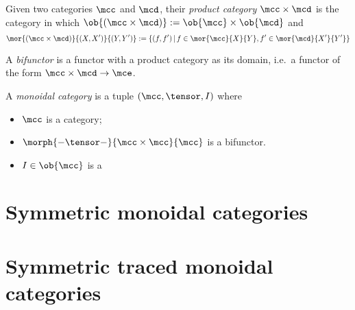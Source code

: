 \begin{definition}
    Given two categories \(\mcc\) and \(\mcd\), their \emph{product category}
    \(\mcc \times \mcd\) is the category in which \(
        \ob{(\mcc \times \mcd)} := \ob{\mcc} \times \ob{\mcd}
    \) and \[
        \mor{(\mcc \times \mcd)}{(X, X^\prime)}{(Y, Y^\prime)}
        :=
        \{
            (f, f^\prime)
            \,|\,
            f \in \mor{\mcc}{X}{Y},
            f^\prime \in \mor{\mcd}{X^\prime}{Y^\prime}
        \}
    \]
\end{definition}

\begin{definition}[Bifunctor]
    A \emph{bifunctor} is a functor with a product category as its domain, i.e.\
    a functor of the form \(\mcc \times \mcd \to \mce\).
\end{definition}


\begin{definition}
    A \emph{monoidal category} is a tuple \((\mcc, \tensor, I)\) where
    \begin{itemize}
        \item \(\mcc\) is a category;
        \item \(\morph{- \tensor -}{\mcc \times \mcc}{\mcc}\) is a bifunctor.
        \item \(I \in \ob{\mcc}\) is a
    \end{itemize}
\end{definition}

\section{Symmetric monoidal categories}

\section{Symmetric traced monoidal categories}